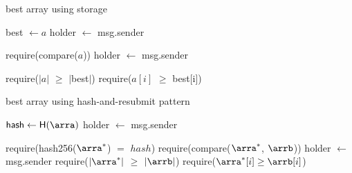 \begin{algorithm}
    \label{alg:game-storage}
    \caption{\textsf{best array} using storage}
    \begin{algorithmic}[1]

        \State \textsf{best} $\gets a$
            \State \textsf{holder $\gets$ msg.sender}
        \EndFunction

            \State \textsf{require}(\textsf{compare}($a$))
            \State \textsf{holder} $\gets$ \textsf{msg.sender}
        \EndFunction

            \State \textsf{require}($|a|$ $\geq$ $|$\textsf{best}$|$)
            \State \textsf{require}($a[i]$ $\geq$ \textsf{best}[i])
            \EndFor
            \State {}
        \EndFunction
        \EndContract
        \vskip8pt
    \end{algorithmic}
\end{algorithm}

\begin{algorithm}
    \label{alg:game-memory}
    \caption{\textsf{best array} using hash-and-resubmit pattern}
    \begin{algorithmic}[1]

        \State $\textsf{hash} \gets \textsf{H}(\arra)$
            \State \textsf{holder} $\gets$ \textsf{msg.sender}
        \EndFunction

    \State \textsf{require}(\textsf{hash256}($\arra^*$) $=$ $hash$)
        \State \textsf{require}(\textsf{compare}($\arra^*$, $\arrb$))
        \State \textsf{holder} $\gets$ \textsf{msg.sender}
    \EndFunction
        \State \textsf{require}($|\arra^*|$ $\geq$ $|\arrb|$)
            \State \textsf{require}($\arra^*[i] \geq \arrb[i]$)
        \EndFor
    \EndFunction
    \State {}
    \EndContract
    \vskip8pt
    \end{algorithmic}
\end{algorithm}
